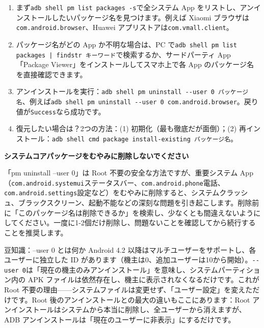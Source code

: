 \begin{enumerate}
  \item まず\texttt{adb shell pm list packages -\allowbreak s}で全システム App をリストし、アンインストールしたいパッケージ名を見つけます。例えば Xiaomi ブラウザは\texttt{com.\allowbreak android.\allowbreak browser}、Huawei アプリストアは\texttt{com.\allowbreak vmall.\allowbreak client}。
  \item パッケージ名がどの App か不明な場合は、PC で\texttt{adb shell pm list packages | findstr キーワード}で検索するか、サードパーティ App「Package Viewer」をインストールしてスマホ上で各 App のパッケージ名を直接確認できます。
  \item アンインストールを実行：\texttt{adb shell pm uninstall -\allowbreak -\allowbreak user 0 パッケージ名}、例えば\texttt{adb shell pm uninstall -\allowbreak -\allowbreak user 0 com.\allowbreak android.\allowbreak browser}。戻り値が\texttt{Success}なら成功です。
  \item 復元したい場合は？2つの方法：(1) 初期化（最も徹底だが面倒）；(2) 再インストール：\texttt{adb shell cmd package install-\allowbreak existing パッケージ名}。
\end{enumerate}

\textbf{システムコアパッケージをむやみに削除しないでください}\par

「pm uninstall --user 0」は Root 不要の安全な方法ですが、重要システム App（\texttt{com.\allowbreak android.\allowbreak systemui}ステータスバー、\texttt{com.\allowbreak android.\allowbreak phone}電話、\texttt{com.\allowbreak android.\allowbreak settings}設定など）をむやみに削除すると、システムクラッシュ、ブラックスクリーン、起動不能などの深刻な問題を引き起こします。削除前に「このパッケージ名は削除できるか」を検索し、少なくとも間違えないようにしてください。一度に1-2個だけ削除し、問題ないことを確認してから続行することを推奨します。

\begin{tcbinfo}{豆知識：--user 0 とは何か}
Android 4.2 以降はマルチユーザーをサポートし、各ユーザーに独立した ID があります（機主は0、追加ユーザーは10から開始）。\texttt{-\allowbreak -\allowbreak user 0}は「現在の機主のみアンインストール」を意味し、システムパーティション内の APK ファイルは依然存在し、機主に表示されなくなるだけです。これが Root 不要の理由——システムファイルは変更せず、「ユーザー設定」を変えただけです。Root 後のアンインストールとの最大の違いもここにあります：Root アンインストールはシステムから本当に削除し、全ユーザーから消えますが、ADB アンインストールは「現在のユーザーに非表示」にするだけです。

\end{tcbinfo}

